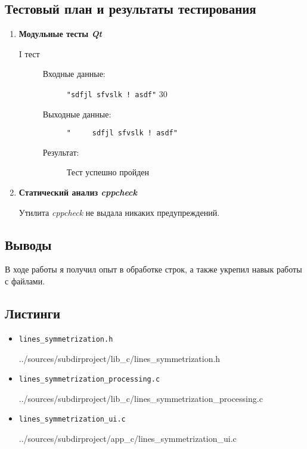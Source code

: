 \documentclass[12pt,a4paper]{report}
\begin{document}
\subsection{Тестовый план и результаты тестирования}
\hspace{\parindent}
\begin{enumerate}
\item \textbf{Модульные тесты \textit{Qt}}

\begin{description}
\item[I тест]
\hspace{\parindent}
\begin{flushleft}
\begin{description}
\item[Входные данные:] \verb-"sdfjl sfvslk ! asdf"- 30


\item[Выходные данные:] \verb-"     sdfjl sfvslk ! asdf"-

\item[Результат:] Тест успешно пройден
\end{description}
\end{flushleft}
\end{description}

\item \textbf{Статический анализ \textit{cppcheck}}

Утилита \textit{cppcheck} не выдала никаких предупреждений.
\end{enumerate}
\subsection{Выводы}
\hspace{\parindent}
В ходе работы я получил опыт в обработке строк, а также укрепил навык работы с файлами.
\subsection*{Листинги}
\begin{itemize}
\item[] \verb-lines_symmetrization.h-

{../sources/subdirproject/lib_c/lines_symmetrization.h}
\item[] \verb-lines_symmetrization_processing.c-

{../sources/subdirproject/lib_c/lines_symmetrization_processing.c}
\item[] \verb-lines_symmetrization_ui.c-

{../sources/subdirproject/app_c/lines_symmetrization_ui.c}
\end{itemize}
%
\end{document}
